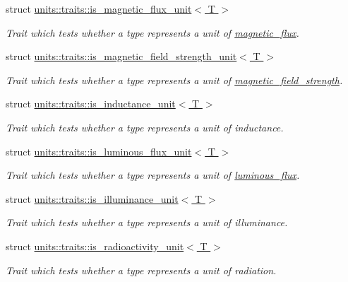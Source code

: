 \begin{DoxyCompactItemize}
struct \hyperlink{structunits_1_1traits_1_1is__magnetic__flux__unit}{units\+::traits\+::is\+\_\+magnetic\+\_\+flux\+\_\+unit$<$ T $>$}
\begin{DoxyCompactList}\small\item\em Trait which tests whether a type represents a unit of \hyperlink{namespaceunits_1_1magnetic__flux}{magnetic\+\_\+flux}. \end{DoxyCompactList}\item 
struct \hyperlink{structunits_1_1traits_1_1is__magnetic__field__strength__unit}{units\+::traits\+::is\+\_\+magnetic\+\_\+field\+\_\+strength\+\_\+unit$<$ T $>$}
\begin{DoxyCompactList}\small\item\em Trait which tests whether a type represents a unit of \hyperlink{namespaceunits_1_1magnetic__field__strength}{magnetic\+\_\+field\+\_\+strength}. \end{DoxyCompactList}\item 
struct \hyperlink{structunits_1_1traits_1_1is__inductance__unit}{units\+::traits\+::is\+\_\+inductance\+\_\+unit$<$ T $>$}
\begin{DoxyCompactList}\small\item\em Trait which tests whether a type represents a unit of inductance. \end{DoxyCompactList}\item 
struct \hyperlink{structunits_1_1traits_1_1is__luminous__flux__unit}{units\+::traits\+::is\+\_\+luminous\+\_\+flux\+\_\+unit$<$ T $>$}
\begin{DoxyCompactList}\small\item\em Trait which tests whether a type represents a unit of \hyperlink{namespaceunits_1_1luminous__flux}{luminous\+\_\+flux}. \end{DoxyCompactList}\item 
struct \hyperlink{structunits_1_1traits_1_1is__illuminance__unit}{units\+::traits\+::is\+\_\+illuminance\+\_\+unit$<$ T $>$}
\begin{DoxyCompactList}\small\item\em Trait which tests whether a type represents a unit of illuminance. \end{DoxyCompactList}\item 
struct \hyperlink{structunits_1_1traits_1_1is__radioactivity__unit}{units\+::traits\+::is\+\_\+radioactivity\+\_\+unit$<$ T $>$}
\begin{DoxyCompactList}\small\item\em Trait which tests whether a type represents a unit of radiation. \end{DoxyCompactList}\item 

\end{DoxyCompactItemize}
